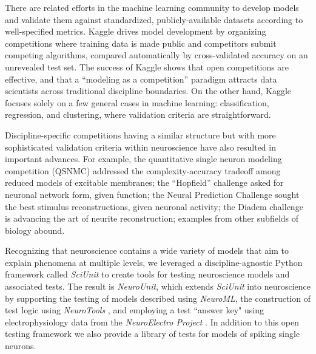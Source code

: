 \documentclass[11pt,letterpaper]{article}
\begin{document}
There are related efforts in the machine learning community to develop models and validate them against standardized, publicly-available datasets according to well-specified metrics. 
Kaggle\cite{kaggle_url} drives model development by organizing competitions where training data is made public and competitors submit competing algorithms, compared automatically by cross-validated accuracy on an unrevealed test set. 
The success of Kaggle shows that open competitions are effective\cite{carpenter_may_2011}, and that a ``modeling as a competition'' paradigm attracts data scientists across traditional discipline boundaries.  
On the other hand, Kaggle focuses solely on a few general cases in machine learning: classification, regression, and clustering, where validation criteria are straightforward.

Discipline-specific competitions having a similar structure but with more sophisticated validation criteria within neuroscience have also resulted in important advances. 
For example, the quantitative single neuron modeling competition (QSNMC)\cite{jolivet_quantitative_2008} addressed the complexity-accuracy tradeoff among reduced models of excitable membranes; 
the ``Hopfield'' challenge\cite{hopfield_what_2000} asked for neuronal network form, given function; 
the Neural Prediction Challenge sought the best stimulus reconstructions, given neuronal activity\cite{neural_prediction_url}; the Diadem challenge is advancing the art of neurite reconstruction\cite{diadem_url}; 
examples from other subfields of biology abound\cite{dream_url}. 

Recognizing that neuroscience contains a wide variety of models that aim to explain phenomena at multiple levels, we leveraged a discipline-agnostic Python framework called \textit{SciUnit}\cite{sciunit_url} to create tools for testing neuroscience models and associated tests.  The result is \textit{NeuroUnit}, which extends \textit{SciUnit} into neuroscience by supporting the testing of models described using \textit{NeuroML}, the construction of test logic using \textit{NeuroTools} \cite{neurotools_url}, and employing a test ``answer key" using electrophysiology data from the \textit{NeuroElectro Project} \cite{neuroelectro_url}.  In addition to this open testing framework we also provide a library of tests for models of spiking single neurons.  

\end{document}
